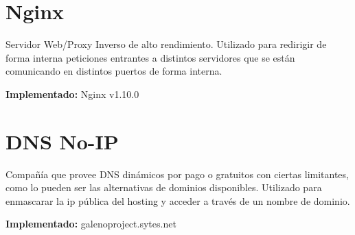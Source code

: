\section{Nginx}
Servidor Web/Proxy Inverso de alto rendimiento. Utilizado para redirigir de forma interna peticiones entrantes a distintos servidores que se están comunicando en distintos puertos de forma interna.

\textbf{Implementado:} Nginx v1.10.0

\section{DNS No-IP}
Compañía que provee DNS dinámicos por pago o gratuitos con ciertas limitantes, como lo pueden ser las alternativas de dominios disponibles. Utilizado para enmascarar la ip pública del hosting y acceder a través de un nombre de dominio.

\textbf{Implementado:} galenoproject.sytes.net



